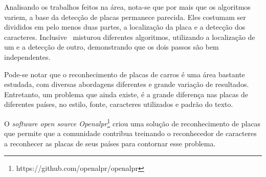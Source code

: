 Analisando os trabalhos feitos na área, nota-se que por mais que os algoritmos variem,
a base da detecção de placas permanece parecida. Eles costumam ser divididos em pelo
menos duas partes, a localização da placa e a detecção dos caracteres. Inclusive~\cite{ahmad2015automatic}
misturou diferentes algoritmos, utilizando a localização de um e a detecção de
outro, demonstrando que os dois passos são bem independentes.

Pode-se notar que o reconhecimento de placas de carros é uma área bastante estudada,
com diversas abordagens diferentes e grande variação de resultados. Entretanto,
um problema que ainda existe, é a grande diferença nas placas de diferentes países,
no estilo, fonte, caracteres utilizados e padrão do texto.

O \emph{software open source Openalpr}\footnote{https://github.com/openalpr/openalpr}
criou uma solução de reconhecimento de placas que permite que a comunidade contribua
treinando o reconhecedor de caracteres a reconhecer as placas de seus países para contornar
esse problema.
